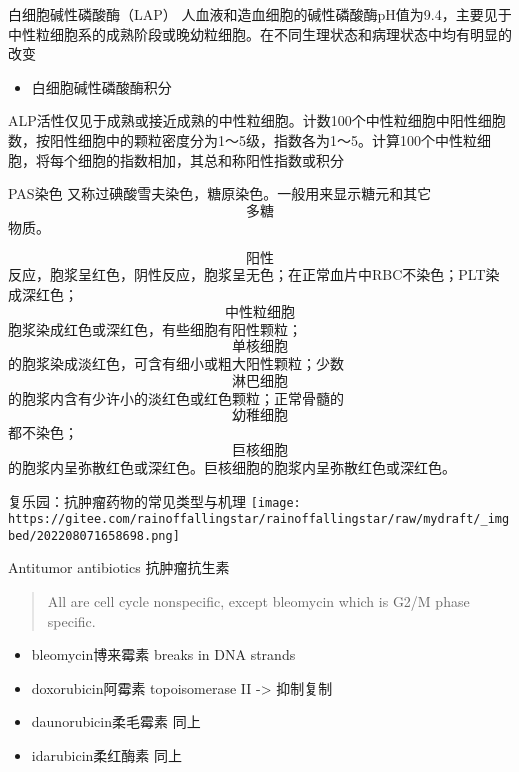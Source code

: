 \documentclass[
  ignorenonframetext,
]{beamer}
\providecommand{\tightlist}{%
  \setlength{\itemsep}{0pt}\setlength{\parskip}{0pt}}
\begin{document}
\begin{frame}
\begin{block}{白细胞碱性磷酸酶（LAP）}
\protect\hypertarget{ux767dux7ec6ux80deux78b1ux6027ux78f7ux9178ux9176lap}{}
人血液和造血细胞的碱性磷酸酶pH值为9.4，主要见于中性粒细胞系的成熟阶段或晚幼粒细胞。在不同生理状态和病理状态中均有明显的改变

\begin{itemize}
\tightlist
\item
  白细胞碱性磷酸酶积分
\end{itemize}

ALP活性仅见于成熟或接近成熟的中性粒细胞。计数100个中性粒细胞中阳性细胞数，按阳性细胞中的颗粒密度分为1～5级，指数各为1～5。计算100个中性粒细胞，将每个细胞的指数相加，其总和称阳性指数或积分
\end{block}
\end{frame}

\begin{frame}
\begin{block}{PAS染色}
\protect\hypertarget{pasux67d3ux8272}{}
又称过碘酸雪夫染色，糖原染色。一般用来显示糖元和其它\[多糖\]物质。

\[阳性\]反应，胞浆呈红色，阴性反应，胞浆呈无色；在正常血片中RBC不染色；PLT染成深红色；\[中性粒细胞\]胞浆染成红色或深红色，有些细胞有阳性颗粒；\[单核细胞\]的胞浆染成淡红色，可含有细小或粗大阳性颗粒；少数\[淋巴细胞\]的胞浆内含有少许小的淡红色或红色颗粒；正常骨髓的\[幼稚细胞\]都不染色；\[巨核细胞\]的胞浆内呈弥散红色或深红色。巨核细胞的胞浆内呈弥散红色或深红色。
\end{block}
\end{frame}

\begin{frame}{复乐园：抗肿瘤药物的常见类型与机理}
\protect\hypertarget{ux590dux4e50ux56edux6297ux80bfux7624ux836fux7269ux7684ux5e38ux89c1ux7c7bux578bux4e0eux673aux7406}{}
\texttt{[image: https://gitee.com/rainoffallingstar/rainoffallingstar/raw/mydraft/\_imgbed/202208071658698.png]}
\end{frame}

\begin{frame}
\begin{block}{Antitumor antibiotics 抗肿瘤抗生素}
\protect\hypertarget{antitumor-antibiotics-ux6297ux80bfux7624ux6297ux751fux7d20}{}
\begin{quote}
All are cell cycle nonspecific, except bleomycin which is G2/M phase
specific.
\end{quote}

\begin{itemize}
\item
  bleomycin博来霉素 breaks in DNA strands
\item
  doxorubicin阿霉素 topoisomerase II -\textgreater{} 抑制复制
\item
  daunorubicin柔毛霉素 同上
\item
  idarubicin柔红酶素 同上
\end{itemize}
\end{block}
\end{frame}
\end{document}
